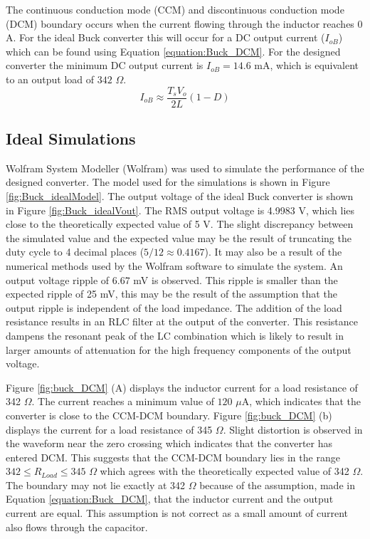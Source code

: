 \documentclass[12pt,twoside]{scrartcl}
\begin{document}
\vspace{5mm}
\noindent The continuous conduction mode (CCM) and discontinuous conduction mode (DCM) boundary occurs when the current flowing through the inductor reaches $0$ A. For the ideal Buck converter this will occur for a DC output current ($I_{oB}$) which can be found using Equation \ref{equation:Buck_DCM}. For the designed converter the minimum DC output current is $I_{oB} = 14.6$ mA, which is equivalent to an output load of $342$ $\Omega$.
\begin{equation}
I_{oB} \approx \frac{T_{s}V_{o}}{2L}(1-D) \label{equation:Buck_DCM}
\end{equation}
\pagebreak
\subsection{Ideal Simulations}
Wolfram System Modeller (Wolfram) was used to simulate the performance of the designed converter. The model used for the simulations is shown in Figure \ref{fig:Buck_idealModel}. The output voltage of the ideal Buck converter is shown in Figure \ref{fig:Buck_idealVout}. The RMS output voltage is 4.9983 V, which lies close to the theoretically expected value of 5 V. The slight discrepancy between the simulated value and the expected value may be the result of truncating the duty cycle to 4 decimal places ($5/12 \approx 0.4167$). It may also be a result of the numerical methods used by the Wolfram software to simulate the system. An output voltage ripple of 6.67 mV is observed. This ripple is smaller than the expected ripple of 25 mV, this may be the result of the assumption that the output ripple is independent of the load impedance. The addition of the load resistance results in an RLC filter at the output of the converter. This resistance dampens the resonant peak of the LC combination which is likely to result in larger amounts of attenuation for the high frequency components of the output voltage.\par
\vspace{5mm}
\noindent Figure \ref{fig:buck_DCM} (A) displays the inductor current for a load resistance of 342 $\Omega$. The current reaches a minimum value of $120 $ $\mu$A, which indicates that the converter is close to the CCM-DCM boundary. Figure \ref{fig:buck_DCM} (b) displays the current for a load resistance of 345 $\Omega$. Slight distortion is observed in the waveform near the zero crossing which indicates that the converter has entered DCM. This suggests that the CCM-DCM boundary lies in the range $342 \le R_{Load} \le 345$ $\Omega$ which agrees with the theoretically expected value of 342 $\Omega$. The boundary may not lie exactly at 342 $\Omega$ because of the assumption, made in Equation \ref{equation:Buck_DCM}, that the inductor current and the output current are equal. This assumption is not correct as a small amount of current also flows through the capacitor.
\end{document}
